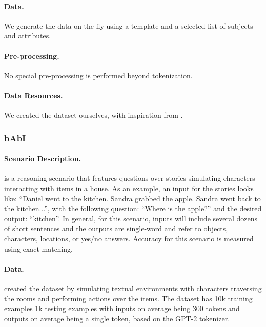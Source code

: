 \paragraph{Data.} We generate the data on the fly using a template and a selected list of subjects and attributes.

\paragraph{Pre-processing.} No special pre-processing is performed beyond tokenization.


\paragraph{Data Resources.}
We created the dataset ourselves, with inspiration from \citep{Clark2020TransformersAS}.



\subsubsection{bAbI}

\paragraph{Scenario Description.}
\babi is a reasoning scenario that features questions over stories simulating characters interacting with items in a house. As an example, an input for the stories looks like: ``Daniel went to the kitchen. Sandra grabbed the apple. Sandra went back to the kitchen...'', with the following question: ``Where is the apple?'' and the desired output: ``kitchen''. In general, for this scenario, inputs will include several dozens of short sentences and the outputs are single-word and refer to objects, characters, locations, or yes/no answers. Accuracy for this scenario is measured using exact matching. 

\paragraph{Data.}
\citet{babi} created the dataset by simulating textual environments with characters traversing the rooms and performing actions over the items. The dataset has 10k training examples 1k testing examples with inputs on average being 300 tokens and outputs on average being a single token, based on the GPT-2 tokenizer. 

